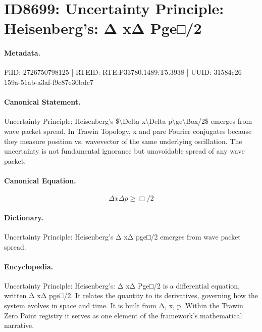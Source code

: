 \section*{ID8699: Uncertainty Principle: Heisenberg's: Δ xΔ Pge□/2}
\paragraph{Metadata.}
PiID: 2726750798125 | RTEID: RTE:P33780.1489:T5.3938 | UUID: 31584c26-159a-51ab-a3af-f9c87e30bdc7

\paragraph{Canonical Statement.}
Uncertainty Principle: Heisenberg's \$\textbackslash{}Delta x\textbackslash{}Delta p\textbackslash{}ge\textbackslash{}Box/2\$ emerges from wave packet spread. In Trawin Topology, x and pare Fourier conjugates because they measure position vs. wavevector of the same underlying oscillation. The uncertainty is not fundamental ignorance but unavoidable spread of any wave packet.

\paragraph{Canonical Equation.}
\[
\Delta x\Delta p\ge\Box/2
\]

\paragraph{Dictionary.}
Uncertainty Principle: Heisenberg's Δ xΔ pge□/2 emerges from wave packet spread.

\paragraph{Encyclopedia.}
Uncertainty Principle: Heisenberg's: Δ xΔ Pge□/2 is a differential equation, written Δ xΔ pge□/2. It relates the quantity to its derivatives, governing how the system evolves in space and time. It is built from Δ, x, p. Within the Trawin Zero Point registry it serves as one element of the framework's mathematical narrative.
